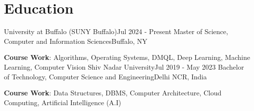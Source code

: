 \documentclass[calibri,10pt]{fed-res}
\begin{document}
\section{Education}
\resumeSubHeadingListStart
\vspace{-1pt}
  
    \resumeSubheading
      {University at Buffalo (SUNY Buffalo)}{Jul 2024 - Present}
      {Master of Science, Computer and Information Sciences}{Buffalo, NY}
      \vspace{0.5 pt}
        \item \textbf{Course Work}:  Algorithms,  Operating Systems, DMQL, Deep Learning, Machine Learning, Computer Vision
   \vspace{-8 pt}
    \resumeSubheading
      {Shiv Nadar University}{Jul 2019 - May 2023}
      {Bachelor of Technology, Computer Science and Engineering}{Delhi NCR, India}
      \vspace{0.5 pt}
      \item \textbf{Course Work}:  Data Structures, DBMS, Computer Architecture, Cloud Computing, Artificial Intelligence (A.I)

   


  \resumeSubHeadingListEnd
\end{document}

